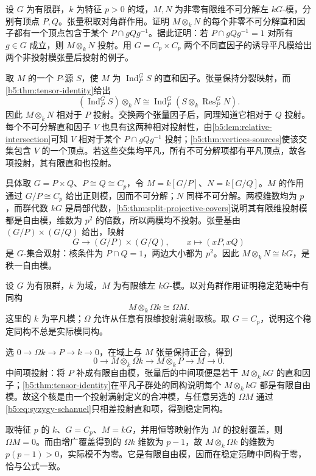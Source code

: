 \begin{optionalexercise}\label{b5:ex:08-tensor-vertex-intersection}
	设 \(G\) 为有限群，\(k\) 为特征 \(p>0\) 的域，\(M,N\) 为非零有限维不可分解左 \(kG\)-模，分别有顶点 \(P,Q\)。张量积取对角群作用。证明 \(M\otimes_kN\) 的每个非零不可分解直和因子都有一个顶点包含于某个 \(P\cap gQg^{-1}\)。据此证明：若 \(P\cap gQg^{-1}=1\) 对所有 \(g\in G\) 成立，则 \(M\otimes_kN\) 投射。用 \(G=C_p\times C_p\) 两个不同直因子的诱导平凡模给出两个非投射模张量后投射的例子。
\end{optionalexercise}
\begin{solution}
	取 \(M\) 的一个 \(P\)-源 \(S\)，使 \(M\) 为 \(\operatorname{Ind}_P^G S\) 的直和因子。张量保持分裂映射，而\cref{b5:thm:tensor-identity}给出
	\[
		(\operatorname{Ind}_P^G S)\otimes_kN
		\cong\operatorname{Ind}_P^G(S\otimes_k\operatorname{Res}_P^GN).
	\]
	因此 \(M\otimes_kN\) 相对于 \(P\) 投射。交换两个张量因子后，同理知道它相对于 \(Q\) 投射。每个不可分解直和因子 \(V\) 也具有这两种相对投射性，由\cref{b5:lem:relative-intersection}可知 \(V\) 相对于某个 \(P\cap gQg^{-1}\) 投射；\cref{b5:thm:vertices-sources}使该交集包含 \(V\) 的一个顶点。若这些交集均平凡，所有不可分解项都有平凡顶点，故各项投射，其有限直和也投射。

	具体取 \(G=P\times Q\)、\(P\cong Q\cong C_p\)，令 \(M=k[G/P]\)、\(N=k[G/Q]\)。\(M\) 的作用通过 \(G/P\cong C_p\) 给出正则模，因而不可分解；\(N\) 同样不可分解。两模维数均为 \(p\)，而群代数 \(kG\) 是局部代数，\cref{b5:thm:split-projective-covers}说明其有限维投射模都是自由模，维数为 \(p^2\) 的倍数，所以两模均不投射。张量基由 \((G/P)\times(G/Q)\) 给出，映射
	\[
		G\longrightarrow(G/P)\times(G/Q),\qquad x\longmapsto(xP,xQ)
	\]
	是 \(G\)-集合双射：核条件为 \(P\cap Q=1\)，两边大小都为 \(p^2\)。因此 \(M\otimes_kN\cong kG\)，是秩一自由模。
\end{solution}

\begin{optionalexercise}\label{b5:ex:08-syzygy-tensor}
	设 \(G\) 为有限群，\(k\) 为域，\(M\) 为有限维左 \(kG\)-模。以对角群作用证明稳定范畴中有同构
	\[
		M\otimes_k\Omega k\cong\Omega M.
	\]
	这里的 \(k\) 为平凡模；\(\Omega\) 允许从任意有限维投射满射取核。取 \(G=C_p\)，说明这个稳定同构不总是实际模同构。
\end{optionalexercise}
\begin{solution}
	选 \(0\to\Omega k\to P\to k\to0\)，在域上与 \(M\) 张量保持正合，得到
	\[
		0\longrightarrow M\otimes_k\Omega k
		\longrightarrow M\otimes_kP\longrightarrow M\longrightarrow0.
	\]
	中间项投射：将 \(P\) 补成有限自由模，张量后的中间项便是若干 \(M\otimes_k kG\) 的直和因子；\cref{b5:thm:tensor-identity}在平凡子群处的同构说明每个 \(M\otimes_k kG\) 都是有限自由模。故这个核是由一个投射满射定义的合冲模，与任意另选的 \(\Omega M\) 通过\eqref{b5:eq:syzygy-schanuel}只相差投射直和项，得到稳定同构。

	取特征 \(p\) 的 \(k\)、\(G=C_p\)、\(M=kG\)，并用恒等映射作为 \(M\) 的投射覆盖，则 \(\Omega M=0\)。而由增广覆盖得到的 \(\Omega k\) 维数为 \(p-1\)，故 \(M\otimes_k\Omega k\) 的维数为 \(p(p-1)>0\)，实际模不为零。它是有限自由模，因而在稳定范畴中同构于零，恰与公式一致。
\end{solution}

